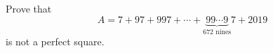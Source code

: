 Prove that
\[
A=7+97+997+\cdots+\underbrace{99\cdots9}_{672\text{ nines}}7+2019
\]
is not a perfect square.
